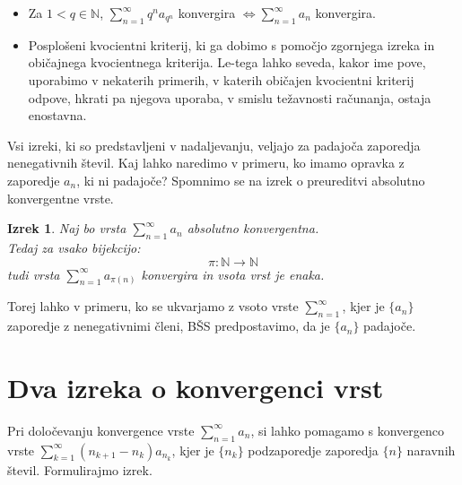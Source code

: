 \documentclass[a4paper,12pt]{article}
\def\N{\mathbb{N}} %
\newtheorem{izrek}{Izrek}
\begin{document}
\begin{itemize}
    \item Za $ 1 < q \in \N$, $\sum_{n = 1}^{\infty}{q^na_{q^n}}$ konvergira $\iff \sum_{n = 1}^{\infty}{a_{n}}$ konvergira.
    \item Posplošeni kvocientni kriterij, ki ga dobimo s pomočjo zgornjega izreka in običajnega kvocientnega kriterija.
    Le-tega lahko seveda, kakor ime pove, uporabimo v nekaterih primerih, v katerih običajen kvocientni kriterij odpove, 
    hkrati pa njegova uporaba, v smislu težavnosti računanja, ostaja enostavna.
\end{itemize}


Vsi izreki, ki so predstavljeni v nadaljevanju, veljajo za padajoča zaporedja nenegativnih števil.
Kaj lahko naredimo v primeru, ko imamo opravka z zaporedje $a_n$, ki ni padajoče?
Spomnimo se na izrek o preureditvi absolutno konvergentne vrste.

\begin{izrek}
    Naj bo vrsta $\sum_{n = 1}^{\infty}{a_n}$ absolutno konvergentna.\\
    Tedaj za vsako bijekcijo:
    \[\pi: \N \rightarrow \N \]
    tudi vrsta $\sum_{n = 1}^{\infty}{a_{\pi(n)}}$ konvergira in vsota vrst je enaka.
\end{izrek}

Torej lahko v primeru, ko se ukvarjamo z vsoto vrste $\sum_{n = 1}^{\infty}$, kjer je $\{a_n\}$ zaporedje z nenegativnimi členi, BŠS predpostavimo, 
da je $\{a_n\}$ padajoče. 

\section{Dva izreka o konvergenci vrst}
Pri določevanju konvergence vrste $\sum_{n = 1}^{\infty}{a_n}$, si lahko pomagamo s konvergenco vrste
$\sum_{k = 1}^{\infty}{(n_{k+1} - n_k)a_{n_{k}}}$, kjer je $\{n_k\}$ podzaporedje zaporedja $\{n\}$ naravnih števil.
Formulirajmo izrek.
\end{document}
